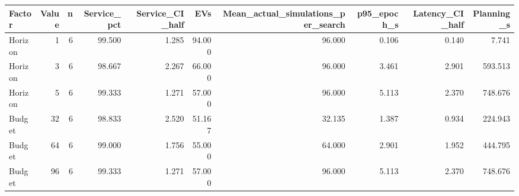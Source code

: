 \begin{tabular}{lrrrrrrrrr}
\toprule
Factor & Value & n & Service\_pct & Service\_CI\_half & EVs & Mean\_actual\_simulations\_per\_search & p95\_epoch\_s & Latency\_CI\_half & Planning\_s \\
\midrule
Horizon & 1 & 6 & 99.500 & 1.285 & 94.000 & 96.000 & 0.106 & 0.140 & 7.741 \\
Horizon & 3 & 6 & 98.667 & 2.267 & 66.000 & 96.000 & 3.461 & 2.901 & 593.513 \\
Horizon & 5 & 6 & 99.333 & 1.271 & 57.000 & 96.000 & 5.113 & 2.370 & 748.676 \\
Budget & 32 & 6 & 98.833 & 2.520 & 51.167 & 32.135 & 1.387 & 0.934 & 224.943 \\
Budget & 64 & 6 & 99.000 & 1.756 & 55.000 & 64.000 & 2.901 & 1.952 & 444.795 \\
Budget & 96 & 6 & 99.333 & 1.271 & 57.000 & 96.000 & 5.113 & 2.370 & 748.676 \\
\bottomrule
\end{tabular}
